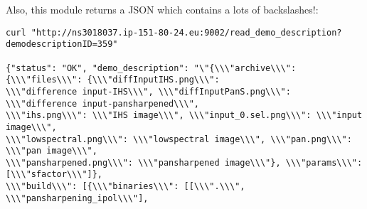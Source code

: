 \documentclass[a4paper,12pt]{article}
\begin{document}
Also, this module returns a JSON which contains a lots of backslashes!:

\begin{verbatim}
curl "http://ns3018037.ip-151-80-24.eu:9002/read_demo_description?demodescriptionID=359"

{"status": "OK", "demo_description": "\"{\\\"archive\\\": {\\\"files\\\": {\\\"diffInputIHS.png\\\":
\\\"difference input-IHS\\\", \\\"diffInputPanS.png\\\": \\\"difference input-pansharpened\\\",
\\\"ihs.png\\\": \\\"IHS image\\\", \\\"input_0.sel.png\\\": \\\"input image\\\",
\\\"lowspectral.png\\\": \\\"lowspectral image\\\", \\\"pan.png\\\": \\\"pan image\\\",
\\\"pansharpened.png\\\": \\\"pansharpened image\\\"}, \\\"params\\\": [\\\"sfactor\\\"]},
\\\"build\\\": [{\\\"binaries\\\": [[\\\".\\\", \\\"pansharpening_ipol\\\"],
\end{verbatim}
\end{document}
